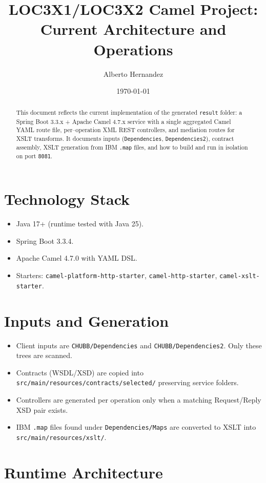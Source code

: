 \documentclass[11pt]{article}
\title{LOC3X1/LOC3X2 Camel Project: Current Architecture and Operations}
\author{Alberto Hernandez}
\date{\today}
\begin{document}
\maketitle

\begin{abstract}
This document reflects the current implementation of the generated \texttt{result} folder: a Spring Boot 3.3.x + Apache Camel 4.7.x service with a single aggregated Camel YAML route file, per–operation XML REST controllers, and mediation routes for XSLT transforms. It documents inputs (\texttt{Dependencies}, \texttt{Dependencies2}), contract assembly, XSLT generation from IBM \texttt{.map} files, and how to build and run in isolation on port \texttt{8081}.
\end{abstract}

\section{Technology Stack}
\begin{itemize}
  \item Java 17+ (runtime tested with Java 25).
  \item Spring Boot 3.3.4.
  \item Apache Camel 4.7.0 with YAML DSL.
  \item Starters: \texttt{camel-platform-http-starter}, \texttt{camel-http-starter}, \texttt{camel-xslt-starter}.
\end{itemize}

\section{Inputs and Generation}
\begin{itemize}
  \item Client inputs are \texttt{CHUBB/Dependencies} and \texttt{CHUBB/Dependencies2}. Only these trees are scanned.
  \item Contracts (WSDL/XSD) are copied into \texttt{src/main/resources/contracts/selected/} preserving service folders.
  \item Controllers are generated per operation only when a matching Request/Reply XSD pair exists.
  \item IBM \texttt{.map} files found under \texttt{Dependencies/Maps} are converted to XSLT into \texttt{src/main/resources/xslt/}.
\end{itemize}

\section{Runtime Architecture}
\end{document}
